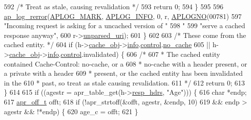 \begin{DoxyCode}
592             \textcolor{comment}{/* Treat as stale, causing revalidation */}
593             \textcolor{keywordflow}{return} 0;
594         \}
595 
596         \hyperlink{group__APACHE__CORE__LOG_ga4c112558ccffd6b363da102b2052d2a6}{ap\_log\_rerror}(\hyperlink{group__APACHE__CORE__LOG_ga655e126996849bcb82e4e5a14c616f4a}{APLOG\_MARK}, \hyperlink{group__APACHE__CORE__LOG_ga47fafbef7e478babdd92e90407f95b19}{APLOG\_INFO}, 0, r, 
      \hyperlink{group__APACHE__CORE__LOG_ga1dee8a07e06bc5b3de8b89662c2cd666}{APLOGNO}(00781)
597                 \textcolor{stringliteral}{"Incoming request is asking for a uncached version of "}
598                 \textcolor{stringliteral}{"%
599                 \textcolor{stringliteral}{"serve a cached response anyway"},
600                 r->\hyperlink{structrequest__rec_a2c0077c30ea4446551ecee4e24ced868}{unparsed\_uri});
601     \}
602 
603     \textcolor{comment}{/* These come from the cached entity. */}
604     \textcolor{keywordflow}{if} (h->\hyperlink{structcache__handle_aea71e9fd166a32e0fe46a12668a1f3bd}{cache\_obj}->\hyperlink{structcache__object_ab4b2aae3e314dfa7abe8304c33cedb83}{info}.\hyperlink{structcache__info_ad13eba54e179bd5b57b7e97b219b3c67}{control}.\hyperlink{structcache__control_a76e5095344c47d185ef638ba1b66f267}{no\_cache}
605             || h->\hyperlink{structcache__handle_aea71e9fd166a32e0fe46a12668a1f3bd}{cache\_obj}->\hyperlink{structcache__object_ab4b2aae3e314dfa7abe8304c33cedb83}{info}.\hyperlink{structcache__info_ad13eba54e179bd5b57b7e97b219b3c67}{control}.invalidated) \{
606         \textcolor{comment}{/*}
607 \textcolor{comment}{         * The cached entity contained Cache-Control: no-cache, or a}
608 \textcolor{comment}{         * no-cache with a header present, or a private with a header}
609 \textcolor{comment}{         * present, or the cached entity has been invalidated in the}
610 \textcolor{comment}{         * past, so treat as stale causing revalidation.}
611 \textcolor{comment}{         */}
612         \textcolor{keywordflow}{return} 0;
613     \}
614 
615     \textcolor{keywordflow}{if} ((agestr = apr\_table\_get(h->\hyperlink{structcache__handle_a66c4c1875bb9740d34ddda4d3e71065e}{resp\_hdrs}, \textcolor{stringliteral}{"Age"}))) \{
616         \textcolor{keywordtype}{char} *endp;
617         \hyperlink{group__apr__platform_ga6938af9075cec15c88299109381aa984}{apr\_off\_t} offt;
618         \textcolor{keywordflow}{if} (!apr\_strtoff(&offt, agestr, &endp, 10)
619                 && endp > agestr && !*endp) \{
620             age\_c = offt;
621         \}
}
\end{DoxyCode}
